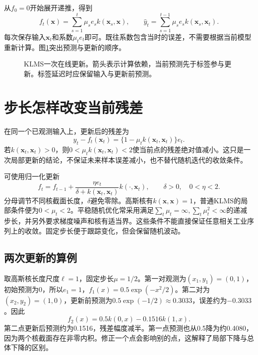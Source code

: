 从$f_0=0$开始展开递推，得到
\begin{equation}
 f_t(\bm x)=\sum_{s=1}^t\mu_s e_s k(\bm x_s,\bm x),\qquad
 \hat y_t=\sum_{s=1}^{t-1}\mu_s e_s k(\bm x_s,\bm x_t).
 \label{eq:klms-expansion}
\end{equation}
每次保存输入$\bm x_t$和系数$\mu_t e_t$即可。既往系数包含当时的误差，不需要根据当前模型重新计算。图\ref{fig:klms-online-update}突出预测与更新的顺序。

\begin{figure}[htbp]
\centering
{}
\caption{KLMS一次在线更新。箭头表示计算依赖，当前预测先于标签参与更新。标签延迟时应保留输入与更新前预测。}
\label{fig:klms-online-update}
\end{figure}

\section{步长怎样改变当前残差}
在同一个已观测输入上，更新后的残差为
\begin{equation}
 y_t-f_t(\bm x_t)=\{1-\mu_t k(\bm x_t,\bm x_t)\}e_t.
\end{equation}
若$k(\bm x_t,\bm x_t)>0$，则$0<\mu_t k(\bm x_t,\bm x_t)<2$使当前点的残差绝对值减小。这只是一次局部更新的结论，不保证未来样本误差减小，也不替代随机迭代的收敛条件。

可使用归一化更新
\begin{equation}
 f_t=f_{t-1}+\frac{\eta e_t}{\delta+k(\bm x_t,\bm x_t)}k(\cdot,\bm x_t),
 \qquad\delta>0,\quad0<\eta<2.
\end{equation}
分母调节不同核截面长度，$\delta$避免零除。高斯核有$k(\bm x,\bm x)=1$，普通KLMS的局部条件便为$0<\mu_t<2$。平稳随机优化常采用满足$\sum_t\mu_t=\infty,\sum_t\mu_t^2<\infty$的递减步长，并另外要求梯度噪声和核有适当界。这些条件不能直接保证任意相关工业序列上的收敛。固定步长便于跟踪变化，但会保留随机波动。

\subsection{两次更新的算例}
取高斯核长度尺度$\ell=1$，固定步长$\mu=1/2$。第一对观测为$(x_1,y_1)=(0,1)$，初始预测为0，所以$e_1=1$，$f_1(x)=0.5\exp(-x^2/2)$。第二对为$(x_2,y_2)=(1,0)$，更新前预测为$0.5\exp(-1/2)\approx0.3033$，误差约为$-0.3033$。因此
\begin{equation}
 f_2(x)=0.5k(0,x)-0.1516k(1,x).
\end{equation}
第二点更新后预测约为0.1516，残差幅度减半。第一点预测也从0.5降为约0.4080，因为两个核截面存在非零内积。修正一个点会影响别的点，这解释了局部下降与总体下降的区别。

